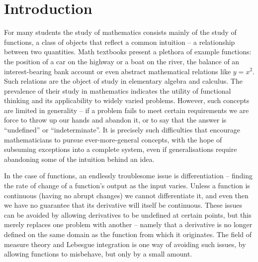 \chapter*{Introduction}

  For many students the study of mathematics consists mainly of the study of functions, a class of objects that reflect a common intuition -- a relationship between two quantities.
  Math textbooks present a plethora of example functions: the position of a car on the highway or a boat on the river, the balance of an interest-bearing bank account or even abstract mathematical relations like $y=x^2$.
  Such relations are the object of study in elementary algebra and calculus. 
  The prevalence of their study in mathematics indicates the utility of functional thinking and its applicability to widely varied problems.
  However, such concepts are limited in generality -- if a problem fails to meet certain requirements we are force to throw up our hands and abandon it, or to say that the answer is ``undefined'' or ``indeterminate''.
  It is precisely such difficulties that encourage mathematicians to pursue ever-more-general concepts, with the hope of subsuming exceptions into a complete system, even if generalisations require abandoning some of the intuition behind an idea.

  In the case of functions, an endlessly troublesome issue is differentiation -- finding the rate of change of a function's output as the input varies.
  Unless a function is continuous (having no abrupt changes) we cannot differentiate it, and even then we have no guarantee that its derivative will itself be continuous.
  These issues can be avoided by allowing derivatives to be undefined at certain points, but this merely replaces one problem with another -- namely that a derivative is no longer defined on the same domain as the function from which it originates.
  The field of measure theory and Lebesgue integration is one way of avoiding such issues, by allowing functions to misbehave, but only by a small amount.

